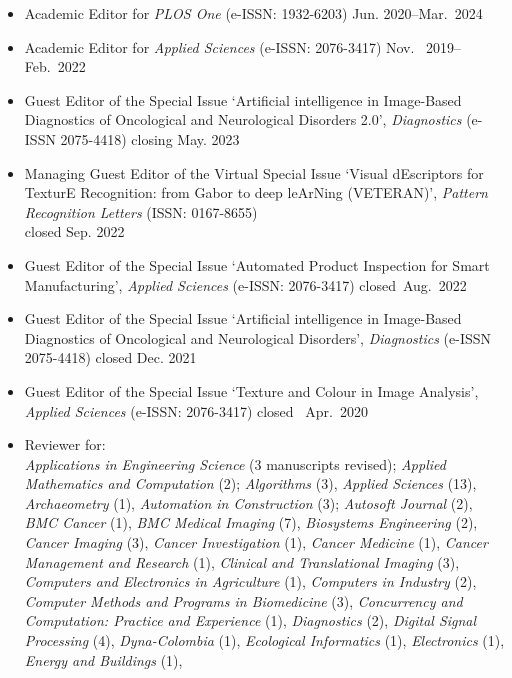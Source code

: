 \documentclass[11pt]{article}
\begin{document}
\begin{itemize}
	\item Academic Editor for \emph{PLOS One} (e-ISSN: 1932-6203) \hfill Jun. 2020--Mar.~2024
	\item Academic Editor for \emph{Applied Sciences} (e-ISSN: 2076-3417) \hfill Nov.~ 2019--Feb.~2022
	\item Guest Editor of the Special Issue `Artificial intelligence in Image-Based Diagnostics of Oncological and Neurological Disorders 2.0', \emph{Diagnostics} (e-ISSN 2075-4418) \hfill closing May. 2023
		\item Managing Guest Editor of the Virtual Special Issue `Visual dEscriptors for TexturE Recognition: from Gabor to deep leArNing (VETERAN)', \emph{Pattern Recognition Letters} (ISSN: 0167-8655) \\ \mbox{} \hfill closed Sep. 2022
	\item Guest Editor of the Special Issue `Automated Product Inspection for Smart Manufacturing', \emph{Applied Sciences} (e-ISSN: 2076-3417) \hfill closed~Aug.~2022
	\item Guest Editor of the Special Issue `Artificial intelligence in Image-Based Diagnostics of Oncological and Neurological Disorders', \emph{Diagnostics} (e-ISSN 2075-4418) \hfill closed Dec. 2021
	\item Guest Editor of the Special Issue `Texture and Colour in Image Analysis', \emph{Applied Sciences} (e-ISSN: 2076-3417) \hfill closed~ Apr.~2020
	\item Reviewer for: \\
		\emph{Applications in Engineering Science} (3 manuscripts revised);
    \emph{Applied Mathematics and Computation} (2);
    \emph{Algorithms} (3),
    \emph{Applied Sciences} (13),
    \emph{Archaeometry} (1),
    \emph{Automation in Construction} (3);
    \emph{Autosoft Journal} (2),
		\emph{BMC Cancer} (1),
    \emph{BMC Medical Imaging} (7),
    \emph{Biosystems Engineering} (2),
    \emph{Cancer Imaging} (3),
    \emph{Cancer Investigation} (1),
    \emph{Cancer Medicine} (1),
    \emph{Cancer Management and Research} (1),
		\emph{Clinical and Translational Imaging} (3),
    \emph{Computers and Electronics in Agriculture} (1),
    \emph{Computers in Industry} (2),
    \emph{Computer Methods and Programs in Biomedicine} (3),
    \emph{Concurrency and Computation: Practice and Experience} (1), 
    \emph{Diagnostics} (2),
    \emph{Digital Signal Processing} (4),
    \emph{Dyna-Colombia} (1),
    \emph{Ecological Informatics} (1),
    \emph{Electronics} (1),
    \emph{Energy and Buildings} (1),

\end{itemize}
\end{document}
